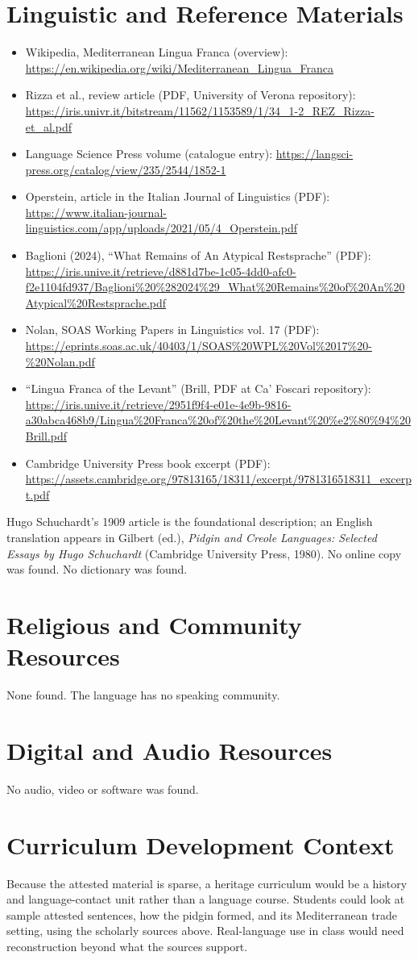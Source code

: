 \documentclass[12pt]{article}
\begin{document}
\section{Linguistic and Reference Materials}
\begin{itemize}
\item Wikipedia, Mediterranean Lingua Franca (overview): \url{https://en.wikipedia.org/wiki/Mediterranean_Lingua_Franca}
\item Rizza et al., review article (PDF, University of Verona repository): \url{https://iris.univr.it/bitstream/11562/1153589/1/34_1-2_REZ_Rizza-et_al.pdf}
\item Language Science Press volume (catalogue entry): \url{https://langsci-press.org/catalog/view/235/2544/1852-1}
\item Operstein, article in the Italian Journal of Linguistics (PDF): \url{https://www.italian-journal-linguistics.com/app/uploads/2021/05/4_Operstein.pdf}
\item Baglioni (2024), ``What Remains of An Atypical Restsprache'' (PDF): \url{https://iris.unive.it/retrieve/d881d7be-1c05-4dd0-afc0-f2e1104fd937/Baglioni\%20\%282024\%29_What\%20Remains\%20of\%20An\%20Atypical\%20Restsprache.pdf}
\item Nolan, SOAS Working Papers in Linguistics vol. 17 (PDF): \url{https://eprints.soas.ac.uk/40403/1/SOAS\%20WPL\%20Vol\%2017\%20-\%20Nolan.pdf}
\item ``Lingua Franca of the Levant'' (Brill, PDF at Ca' Foscari repository): \url{https://iris.unive.it/retrieve/2951f9f4-e01e-4e9b-9816-a30abca468b9/Lingua\%20Franca\%20of\%20the\%20Levant\%20\%e2\%80\%94\%20Brill.pdf}
\item Cambridge University Press book excerpt (PDF): \url{https://assets.cambridge.org/97813165/18311/excerpt/9781316518311_excerpt.pdf}
\end{itemize}
Hugo Schuchardt's 1909 article is the foundational description; an English translation appears in Gilbert (ed.), \emph{Pidgin and Creole Languages: Selected Essays by Hugo Schuchardt} (Cambridge University Press, 1980). No online copy was found. No dictionary was found.

\section{Religious and Community Resources}
None found. The language has no speaking community.

\section{Digital and Audio Resources}
No audio, video or software was found.

\section{Curriculum Development Context}
Because the attested material is sparse, a heritage curriculum would be a history and language-contact unit rather than a language course. Students could look at sample attested sentences, how the pidgin formed, and its Mediterranean trade setting, using the scholarly sources above. Real-language use in class would need reconstruction beyond what the sources support.
\end{document}
